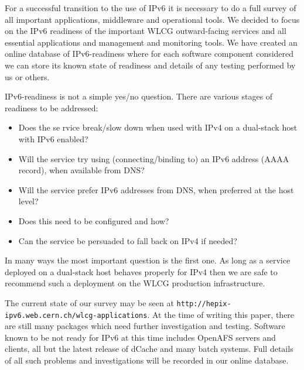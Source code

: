 For a successful transition to the use of IPv6 it is necessary to do a full survey of all important applications, middleware and operational tools. We decided to focus on the IPv6 readiness of the important WLCG outward-facing services and all essential applications and management and monitoring tools. We have created an online database of IPv6-readiness where for each software component considered we can store its known state of readiness and details of any testing performed by us or others.

IPv6-readiness is not a simple yes/no question. There are various stages of readiness to be addressed:
\begin {itemize}
\item Does the se rvice break/slow down when used with IPv4 on a dual-stack host with IPv6 enabled?
\item Will the service try using (connecting/binding to) an IPv6 address (AAAA record), when available from DNS?
\item Will the service prefer IPv6 addresses from DNS, when preferred at the host level?
\item Does this need to be configured and how?
\item Can the service be persuaded to fall back on IPv4 if needed?
\end {itemize}

In many ways the most important question is the first one. As long as a service deployed on a dual-stack host behaves properly for IPv4 then we are safe to recommend such a deployment on the WLCG production infrastructure.

The current state of our survey may be seen at {\tt http://hepix-ipv6.web.cern.ch/wlcg-applications}. At the time of 
writing this paper, there are still many packages which need further investigation and testing. Software known to be 
not ready for IPv6 at this time includes OpenAFS servers and clients, all but the latest release of dCache and many batch systems. Full details of all such problems and investigations will be recorded in our online database.


